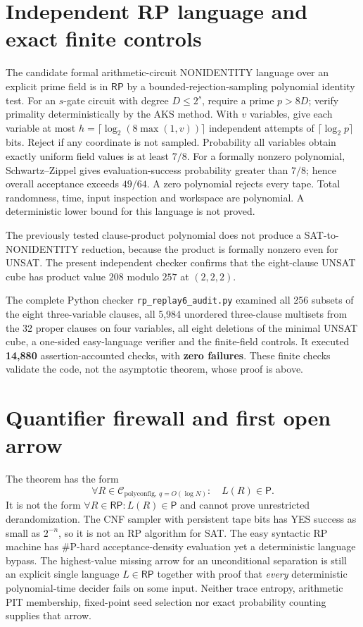 \documentclass[11pt]{article}
\newcommand{\RP}{\mathsf{RP}}
\newcommand{\PP}{\mathsf{P}}
\begin{document}
\section{Independent RP language and exact finite controls}
The candidate formal arithmetic-circuit NONIDENTITY language over an explicit prime field is in $\RP$ by a bounded-rejection-sampling polynomial identity test. For an $s$-gate circuit with degree $D\le2^s$, require a prime $p>8D$; verify primality deterministically by the AKS method. With $v$ variables, give each variable at most $h=\lceil\log_2(8\max(1,v))\rceil$ independent attempts of $\lceil\log_2p\rceil$ bits. Reject if any coordinate is not sampled. Probability all variables obtain exactly uniform field values is at least $7/8$. For a formally nonzero polynomial, Schwartz--Zippel gives evaluation-success probability greater than $7/8$; hence overall acceptance exceeds $49/64$. A zero polynomial rejects every tape. Total randomness, time, input inspection and workspace are polynomial. A deterministic lower bound for this language is not proved.

The previously tested clause-product polynomial does not produce a SAT-to-NONIDENTITY reduction, because the product is formally nonzero even for UNSAT. The present independent checker confirms that the eight-clause UNSAT cube has product value $208$ modulo $257$ at $(2,2,2)$.

The complete Python checker \texttt{rp\_replay6\_audit.py} examined all 256 subsets of the eight three-variable clauses, all 5,984 unordered three-clause multisets from the 32 proper clauses on four variables, all eight deletions of the minimal UNSAT cube, a one-sided easy-language verifier and the finite-field controls. It executed \textbf{14,880} assertion-accounted checks, with \textbf{zero failures}. These finite checks validate the code, not the asymptotic theorem, whose proof is above.

\section{Quantifier firewall and first open arrow}
The theorem has the form
\[
\forall R\in \mathcal C_{\mathrm{polyconfig},\,q=O(\log N)}:\quad L(R)\in\PP.
\]
It is not the form $\forall R\in\RP:L(R)\in\PP$ and cannot prove unrestricted derandomization. The CNF sampler with persistent tape bits has YES success as small as $2^{-n}$, so it is not an RP algorithm for SAT. The easy syntactic RP machine has $\#\mathrm P$-hard acceptance-density evaluation yet a deterministic language bypass. The highest-value missing arrow for an unconditional separation is still an explicit single language $L\in\RP$ together with proof that \emph{every} deterministic polynomial-time decider fails on some input. Neither trace entropy, arithmetic PIT membership, fixed-point seed selection nor exact probability counting supplies that arrow.
\end{document}
